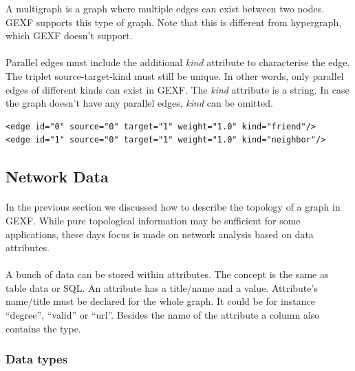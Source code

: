 \documentclass[a4paper,10pt]{article}
\begin{document}
A multigraph is a graph where multiple edges can exist between two nodes.
GEXF supports this type of graph.
Note that this is different from hypergraph, which GEXF doesn't support.

\paragraph{}
Parallel edges must include the additional \textit{kind} attribute to characterise the edge. The triplet source-target-kind must still be unique. In other words, only parallel edges of different kinds can exist in GEXF. The \textit{kind} attribute is a string. In case the graph doesn't have any parallel edges, \textit{kind} can be omitted.

\lstset{ style=gexf }
\begin{lstlisting}[caption={Parallel edges},label=paralelEdge]
<edge id="0" source="0" target="1" weight="1.0" kind="friend"/>
<edge id="1" source="0" target="1" weight="1.0" kind="neighbor"/>
\end{lstlisting}

\subsection{Network Data} \label{networkdata}

\paragraph{}
In the previous section we discussed how to describe the topology of a graph in GEXF. While pure topological information may be sufficient for some applications, these days focus is made on network analysis based on data attributes.

\paragraph{}
A bunch of data can be stored within attributes. The concept is the same as table data or SQL. An attribute has a title/name and a value. Attribute’s name/title must be declared for the whole graph. It could be for instance “degree”, “valid” or “url”. Besides the name of the attribute a column also contains the type.

\subsubsection{Data types}
\end{document}
